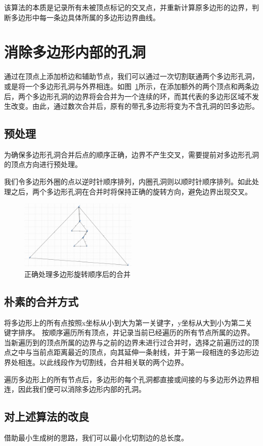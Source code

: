 该算法的本质是记录所有未被顶点标记的交叉点，并重新计算原多边形的边界，判断多边形中每一条边具体所属的多边形边界曲线。
\section{消除多边形内部的孔洞}
通过在顶点上添加桥边和辅助节点，我们可以通过一次切割联通两个多边形孔洞，或是将一个多边形孔洞与外界相连。如图~\ref*{merge}所示，在添加额外的两个顶点和两条边后，两个多边形孔洞的边界将会合并为一个连续的环，而其代表的多边形区域不发生改变。由此，通过数次合并后，原有的带孔多边形将变为不含孔洞的凹多边形。
\subsection{预处理}
为确保多边形孔洞合并后点的顺序正确，边界不产生交叉，需要提前对多边形孔洞的顶点方向进行预处理。

我们令多边形外圈的点以逆时针顺序排列，内圈孔洞则以顺时针顺序排列。如此处理之后，两个多边形孔洞在合并时将保持正确的旋转方向，避免边界出现交叉。

\begin{figure}[htp]
    \centering
    \includegraphics[width=0.5\textwidth]
    {figures/mergehole.png}
    \caption{正确处理多边形旋转顺序后的合并}
    \label{merge}
  \end{figure}

\subsection{朴素的合并方式}
将多边形上的所有点按照x坐标从小到大为第一关键字，y坐标从大到小为第二关键字排序。
按顺序遍历所有顶点，并记录当前已经遍历的所有节点所属的边界。
当新遍历到的顶点所属的边界与之前的边界未进行过合并时，选择之前遍历过的顶点之中与当前点距离最近的顶点，向其延伸一条射线，并于第一段相连的多边形边界处相连。以此线段作为切割线，合并相关联的两个边界。

遍历多边形上的所有节点后，多边形的每个孔洞都直接或间接的与多边形外边界相连，因此我们便可以消除多边形内部的孔洞。
\subsection{对上述算法的改良}
借助最小生成树的思路，我们可以最小化切割边的总长度。

